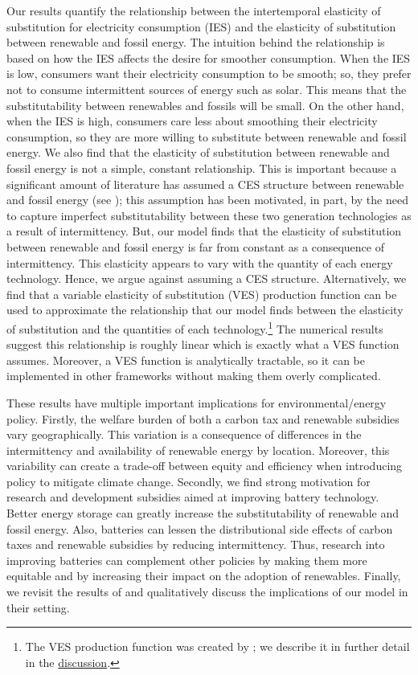 \documentclass[11pt,a4paper,leqno]{extarticle}
\begin{document}
	
	Our results quantify the relationship between the intertemporal elasticity of substitution for electricity consumption  (IES) and the elasticity of substitution between renewable and fossil energy. The intuition behind the relationship is based on how the IES affects the desire for smoother consumption. When the IES is low, consumers want their electricity consumption to be smooth; so, they prefer not to consume intermittent sources of energy such as solar. This means that the substitutability between renewables and fossils will be small. On the other hand, when the IES is high, consumers care less about smoothing their electricity consumption, so they are more willing to substitute between renewable and fossil energy.  We also find that the elasticity of substitution between renewable and fossil energy is not a simple, constant relationship. This is important because a significant amount of literature has assumed a CES structure between renewable and fossil energy (see \citet{Pap}); this assumption has been motivated, in part, by the need to capture imperfect substitutability between these two generation technologies as a result of intermittency. But, our model finds that the elasticity of substitution between renewable and fossil energy is far from constant as a consequence of intermittency. This elasticity appears to vary with the quantity of each energy technology. Hence, we argue against assuming a CES structure. Alternatively, we find that a variable elasticity of substitution (VES) production function can be used to approximate the relationship that our model finds between the elasticity of substitution and the quantities of each technology.\footnote{ The VES production function was created by \citet{VES}; we describe it in further detail in the \hyperref[sec:VES]{discussion}. } The numerical results suggest this relationship is roughly linear which is exactly what a VES function assumes. Moreover, a VES function is analytically tractable, so it can be implemented in other frameworks without making them overly complicated. 
	
	These results have multiple important implications for environmental/energy policy. Firstly, the welfare burden of both a carbon tax and renewable subsidies vary geographically. This variation is a consequence of differences in the intermittency and availability of renewable energy by location. Moreover, this variability can create a trade-off between equity and efficiency when introducing policy to mitigate climate change. Secondly, we find strong motivation for research and development subsidies aimed at improving battery technology. Better energy storage can greatly increase the substitutability of renewable and fossil energy.  Also, batteries can  lessen the distributional side effects of carbon taxes and renewable subsidies by  reducing intermittency. Thus, research into improving batteries can complement other policies by making them more equitable and by increasing their impact on the adoption of renewables. Finally, we revisit the results of \citet{Ace2012} and qualitatively discuss the implications of our model in their setting.
	
\end{document}
